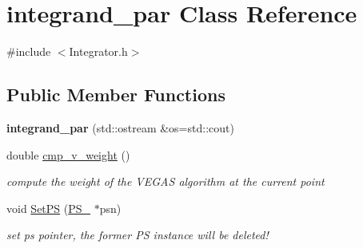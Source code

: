 \hypertarget{classintegrand__par}{}\section{integrand\+\_\+par Class Reference}
\label{classintegrand__par}


{\ttfamily \#include $<$Integrator.\+h$>$}

\subsection*{Public Member Functions}
\begin{DoxyCompactItemize}
\item 
\hypertarget{classintegrand__par_a91beb4d7cdba03603a3d95d46ee0621f}{}{\bfseries integrand\+\_\+par} (std\+::ostream \&os=std\+::cout)\label{classintegrand__par_a91beb4d7cdba03603a3d95d46ee0621f}

\item 
\hypertarget{classintegrand__par_aac7bdde6abcb8d81db5af3a24ce51f7d}{}double \hyperlink{classintegrand__par_aac7bdde6abcb8d81db5af3a24ce51f7d}{cmp\+\_\+v\+\_\+weight} ()\label{classintegrand__par_aac7bdde6abcb8d81db5af3a24ce51f7d}

\begin{DoxyCompactList}\small\item\em compute the weight of the V\+E\+G\+A\+S algorithm at the current point \end{DoxyCompactList}\item 
\hypertarget{classintegrand__par_a18a461b09009de0b9f8c6139994c52c4}{}void \hyperlink{classintegrand__par_a18a461b09009de0b9f8c6139994c52c4}{Set\+P\+S} (\hyperlink{classPS__2}{P\+S\+\_} $\ast$psn)\label{classintegrand__par_a18a461b09009de0b9f8c6139994c52c4}

\begin{DoxyCompactList}\small\item\em set ps pointer, the former P\+S instance will be deleted! \end{DoxyCompactList}\end{DoxyCompactItemize}
